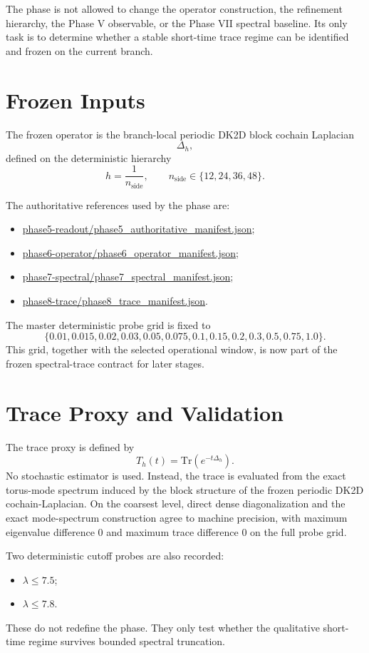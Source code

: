 \documentclass[11pt]{article}
\begin{document}
The phase is not allowed to change the operator construction, the refinement hierarchy, the Phase V observable, or the Phase VII spectral baseline. Its only task is to determine whether a stable short-time trace regime can be identified and frozen on the current branch.

\section{Frozen Inputs}

The frozen operator is the branch-local periodic DK2D block cochain Laplacian
\[
\Delta_h,
\]
defined on the deterministic hierarchy
\[
h = \frac{1}{n_{\mathrm{side}}}, \qquad n_{\mathrm{side}} \in \{12,24,36,48\}.
\]

The authoritative references used by the phase are:
\begin{itemize}
\item \url{phase5-readout/phase5_authoritative_manifest.json};
\item \url{phase6-operator/phase6_operator_manifest.json};
\item \url{phase7-spectral/phase7_spectral_manifest.json};
\item \url{phase8-trace/phase8_trace_manifest.json}.
\end{itemize}

The master deterministic probe grid is fixed to
\[
\{0.01, 0.015, 0.02, 0.03, 0.05, 0.075, 0.1, 0.15, 0.2, 0.3, 0.5, 0.75, 1.0\}.
\]
This grid, together with the selected operational window, is now part of the frozen spectral-trace contract for later stages.

\section{Trace Proxy and Validation}

The trace proxy is defined by
\[
T_h(t) = \mathrm{Tr}\!\left(e^{-t \Delta_h}\right).
\]
No stochastic estimator is used. Instead, the trace is evaluated from the exact torus-mode spectrum induced by the block structure of the frozen periodic DK2D cochain-Laplacian. On the coarsest level, direct dense diagonalization and the exact mode-spectrum construction agree to machine precision, with maximum eigenvalue difference $0$ and maximum trace difference $0$ on the full probe grid.

Two deterministic cutoff probes are also recorded:
\begin{itemize}
\item $\lambda \le 7.5$;
\item $\lambda \le 7.8$.
\end{itemize}
These do not redefine the phase. They only test whether the qualitative short-time regime survives bounded spectral truncation.
\end{document}
